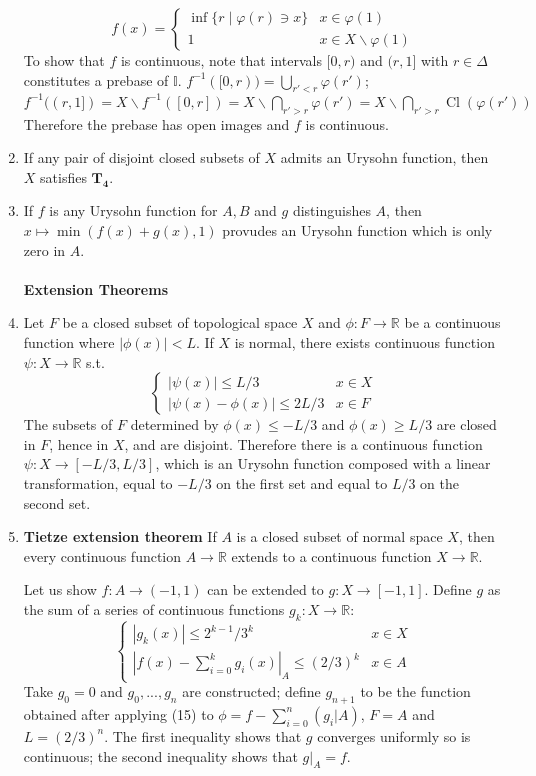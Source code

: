 \documentclass{article}
\DeclareMathOperator{\Cl}{Cl}
\begin{document}
\begin{enumerate}
\[f(x)=\begin{cases}\inf\{r\;|\;\varphi(r)\ni x\}&x\in\varphi(1)\\1&x\in X\backslash\varphi(1)\end{cases}\]
To show that \(f\) is continuous, note that intervals \([0,r)\) and \((r,1]\) with \(r\in\Delta\) constitutes a prebase of \(\mathbb{I}\).
\(f^{-1}([0,r))=\bigcup_{r'<r}\varphi(r')\); \(f^{-1}((r,1])=X\backslash f^{-1}([0,r])=X\backslash \bigcap_{r'>r}\varphi(r')=X\backslash \bigcap_{r'>r}\Cl(\varphi(r'))\)
Therefore the prebase has open images and \(f\) is continuous.
\item If any pair of disjoint closed subsets of \(X\) admits an Urysohn function, then \(X\) satisfies \(\mathbf{T_{4}}\).
\item If \(f\) is any Urysohn function for \(A,B\) and \(g\) distinguishes \(A\), then \(x\mapsto\min(f(x)+g(x),1)\) provudes an Urysohn function which is only zero in \(A\).
\\\\
\textbf{Extension Theorems}
\item Let \(F\) be a closed subset of topological space \(X\) and \(\phi:F\to\mathbb{R}\) be a continuous function where \(|\phi(x)|<L\). If \(X\) is normal, there exists continuous function \(\psi:X\to\mathbb{R}\) s.t.
\[\begin{cases}|\psi(x)|\le L/3&x\in X \\ |\psi(x)-\phi(x)|\le 2L/3&x\in F\end{cases}\]
The subsets of \(F\) determined by \(\phi(x)\le-L/3\) and \(\phi(x)\ge L/3\) are closed in \(F\), hence in \(X\), and are disjoint. 
Therefore there is a continuous function \(\psi: X\to[-L/3, L/3]\), which is an Urysohn function composed with a linear transformation, equal to \(-L/3\) on the first set and equal to \(L/3\) on the second set.
\item \textbf{Tietze extension theorem} If \(A\) is a closed subset of normal space \(X\), then every continuous function \(A\to\mathbb{R}\) extends to a continuous function \(X\to\mathbb{R}\).

Let us show \(f:A\to(-1,1)\) can be extended to \(g:X\to[-1,1]\). Define \(g\) as the sum of a series of continuous functions \(g_{k}:X\to\mathbb{R}\):
\[\begin{cases}|g_{k}(x)|\le 2^{k-1}/3^{k}&x\in X\\|f(x)-\sum_{i=0}^{k}g_{i}(x)|_{A}\le (2/3)^{k}&x\in A\end{cases}\]
Take \(g_{0}=0\) and \(g_{0},...,g_{n}\) are constructed; define \(g_{n+1}\) to be the function obtained after applying \color{gray}(15) \color{black} to \(\phi=f-\sum_{i=0}^{n}(g_{i}|A)\), \(F=A\) and \(L=(2/3)^{n}\).
The first inequality shows that \(g\) converges uniformly so is continuous; the second inequality shows that \(g|_{A}=f\).


\end{enumerate}
\end{document}
